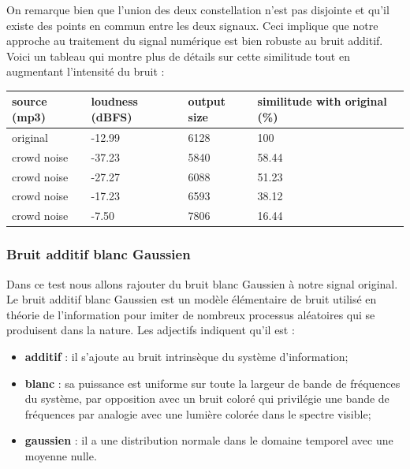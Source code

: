 \documentclass[11pt, report, french]{scrreprt}
\begin{document}
On remarque bien que l'union des deux constellation n'est pas disjointe et qu'il existe des points en commun entre les deux signaux. Ceci implique que notre approche au traitement du signal numérique est bien robuste au bruit additif.\\

Voici un tableau qui montre plus de détails sur cette similitude tout en augmentant l'intensité du bruit :

\begin{center}
	\begin{tabular}{ | m{3cm} || m{3cm}| m{3cm} | m{5cm} | } 
		\hline
		source (mp3) & loudness (dBFS) & output size & similitude with original (\%) \\ 
		\hline
		\hline
		original & -12.99 & 6128 & 100  \\ 
		\hline
		crowd noise & -37.23  & 5840 & 58.44  \\ 
		\hline
		crowd noise & -27.27 & 6088 & 51.23  \\ 
		\hline
		crowd noise & -17.23 & 6593 & 38.12  \\ 
		\hline
		crowd noise & -7.50 & 7806 & 16.44  \\ 
		\hline
	\end{tabular}
\end{center}

\subsubsection{Bruit additif blanc Gaussien}
Dans ce test nous allons rajouter du bruit blanc Gaussien à notre signal original. Le bruit additif blanc Gaussien est un modèle élémentaire de bruit utilisé en théorie de l'information pour imiter de nombreux processus aléatoires qui se produisent dans la nature. Les adjectifs indiquent qu'il est :\\

\begin{itemize}
	\item \textbf{additif} : il s'ajoute au bruit intrinsèque du système d'information;
	\item \textbf{blanc} : sa puissance est uniforme sur toute la largeur de bande de fréquences du système, par opposition avec un bruit coloré qui privilégie une bande de fréquences par analogie avec une lumière colorée dans le spectre visible; 
	\item \textbf{gaussien} : il a une distribution normale dans le domaine temporel avec une moyenne nulle.
\end{itemize}
\end{document}
